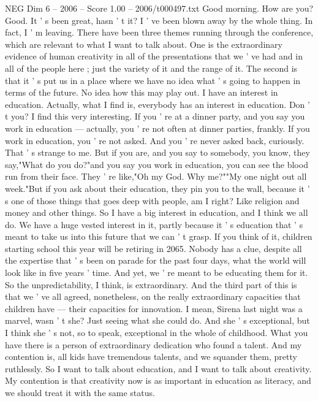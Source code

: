 \begin{textsample}{NEG Dim 6 – 2006 – Score 1.00 – 2006/t000497.txt}  \label{ex:f6_neg_069}
Good morning.
How are you?
Good.
It ' s been great, hasn ' t it?
I ' ve been blown away by the whole thing.
In fact, I ' m leaving.
There have been three themes running through the conference, which are relevant to what I want to talk about.
One is the extraordinary evidence of human creativity in all of the presentations that we ' ve had and in all of the people here ; just the variety of it and the range of it.
The second is that it ' s put us in a place where we have no idea what ' s going to happen in terms of the future.
No idea how this may play out.
I have an interest in education.
Actually, what I find is, everybody has an interest in education.
Don ' t you?
I find this very interesting.
If you ' re at a dinner party, and you say you work in education — actually, you ' re not often at dinner parties, frankly.
If you work in education, you ' re not asked.
And you ' re never asked back, curiously.
That ' s strange to me.
But if you are, and you say to somebody, you know, they say,"What do you do?"and you say you work in education, you can see the blood run from their face.
They ' re like,"Oh my God.
Why me?""My one night out all week."But if you ask about their education, they pin you to the wall, because it ' s one of those things that goes deep with people, am I right?
Like religion and money and other things.
So I have a big interest in education, and I think we all do.
We have a huge vested interest in it, partly because it ' s education that ' s meant to take us into this future that we can ' t grasp.
If you think of it, children starting school this year will be retiring in 2065.
Nobody has a clue, despite all the expertise that ' s been on parade for the past four days, what the world will look like in five years ' time.
And yet, we ' re meant to be educating them for it.
So the unpredictability, I think, is extraordinary.
And the third part of this is that we ' ve all agreed, nonetheless, on the really extraordinary capacities that children have — their capacities for innovation.
I mean, Sirena last night was a marvel, wasn ' t she?
Just seeing what she could do.
And she ' s exceptional, but I think she ' s not, so to speak, exceptional in the whole of childhood.
What you have there is a person of extraordinary dedication who found a talent.
And my contention is, all kids have tremendous talents, and we squander them, pretty ruthlessly.
So I want to talk about education, and I want to talk about creativity.
My contention is that creativity now is as important in education as literacy, and we should treat it with the same status.

\end{textsample}
